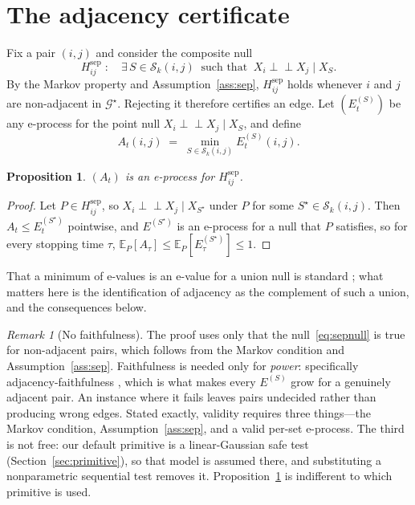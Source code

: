\documentclass[11pt,a4paper]{article}
\newtheorem{proposition}[theorem]{Proposition}
\theoremstyle{definition}
\theoremstyle{remark}
\newtheorem{remark}[theorem]{Remark}
\newcommand{\indep}{\perp\!\!\!\perp}
\newcommand{\Scal}{\mathcal{S}}
\newcommand{\Gstar}{\mathcal{G}^{\star}}
\begin{document}
\section{The adjacency certificate}
\label{sec:adjacency}

Fix a pair $(i,j)$ and consider the composite null
\begin{equation}
\label{eq:sepnull}
H^{\mathrm{sep}}_{ij} \;:\quad
\exists\, S \in \Scal_k(i,j) \ \text{ such that } \ X_i \indep X_j \mid X_S .
\end{equation}
By the Markov property and Assumption~\ref{ass:sep}, $H^{\mathrm{sep}}_{ij}$
holds whenever $i$ and $j$ are non-adjacent in $\Gstar$. Rejecting it therefore
certifies an edge. Let $(E^{(S)}_t)$ be any e-process for the point null
$X_i \indep X_j \mid X_S$, and define
\begin{equation}
\label{eq:adjacency}
A_t(i,j) \;=\; \min_{S \in \Scal_k(i,j)} E^{(S)}_t(i,j) .
\end{equation}

\begin{proposition}
\label{prop:adjacency}
$(A_t)$ is an e-process for $H^{\mathrm{sep}}_{ij}$.
\end{proposition}

\begin{proof}
Let $P \in H^{\mathrm{sep}}_{ij}$, so $X_i \indep X_j \mid X_{S^\star}$ under
$P$ for some $S^\star \in \Scal_k(i,j)$. Then $A_t \le E^{(S^\star)}_t$
pointwise, and $E^{(S^\star)}$ is an e-process for a null that $P$ satisfies, so
for every stopping time $\tau$,
$\mathbb{E}_P[A_\tau] \le \mathbb{E}_P[E^{(S^\star)}_\tau] \le 1$.
\end{proof}

That a minimum of e-values is an e-value for a union null is standard
\citep{vovk2021evalues}; what matters here is the identification of adjacency
as the complement of such a union, and the consequences below.

\begin{remark}[No faithfulness]
\label{rem:faithfulness}
The proof uses only that the null~\eqref{eq:sepnull} is true for non-adjacent
pairs, which follows from the Markov condition and
Assumption~\ref{ass:sep}. Faithfulness is needed only for \emph{power}:
specifically adjacency-faithfulness \citep{ramsey2006adjacency}, which is what
makes every $E^{(S)}$ grow for a genuinely adjacent pair. An instance where it
fails leaves pairs undecided rather than producing wrong edges. Stated exactly,
validity requires three things---the Markov condition, Assumption~\ref{ass:sep},
and a valid per-set e-process. The third is not free: our default primitive is
a linear-Gaussian safe test (Section~\ref{sec:primitive}), so that model is
assumed there, and substituting a nonparametric sequential test
\citep{he2026sequential} removes it. Proposition~\ref{prop:adjacency} is
indifferent to which primitive is used.
\end{remark}
\end{document}
